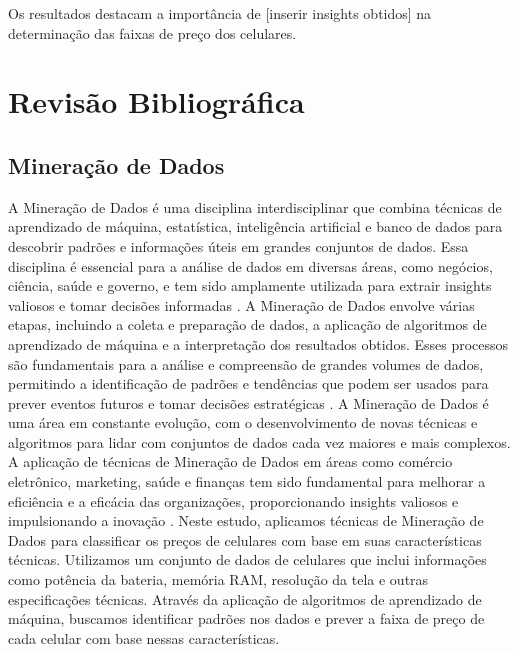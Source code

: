 \documentclass[conference]{IEEEtran}
\begin{document}
Os resultados destacam a importância de [inserir insights obtidos] na determinação das faixas de preço dos celulares.


\section{Revisão Bibliográfica}

\subsection{Mineração de Dados}
A Mineração de Dados é uma disciplina interdisciplinar que combina técnicas de
aprendizado de máquina, estatística, inteligência artificial e banco de dados para
descobrir padrões e informações úteis em grandes conjuntos de dados.
Essa disciplina é essencial para a análise de dados em diversas áreas, como
negócios, ciência, saúde e governo, e tem sido amplamente utilizada para
extrair insights valiosos e tomar decisões informadas \cite{Han2011}.
A Mineração de Dados envolve várias etapas, incluindo a coleta e preparação de
dados, a aplicação de algoritmos de aprendizado de máquina e a interpretação dos
resultados obtidos. Esses processos são fundamentais para a análise e
compreensão de grandes volumes de dados, permitindo a identificação de padrões
e tendências que podem ser usados para prever eventos futuros e tomar decisões
estratégicas \cite{Witten2011}.
A Mineração de Dados é uma área em constante evolução, com o desenvolvimento de
novas técnicas e algoritmos para lidar com conjuntos de dados cada vez maiores e
mais complexos. A aplicação de técnicas de Mineração de Dados em áreas como
comércio eletrônico, marketing, saúde e finanças tem sido fundamental para
melhorar a eficiência e a eficácia das organizações, proporcionando insights
valiosos e impulsionando a inovação \cite{Fayyad1996}.
Neste estudo, aplicamos técnicas de Mineração de Dados para classificar os preços
de celulares com base em suas características técnicas. Utilizamos um conjunto de
dados de celulares que inclui informações como potência da bateria, memória RAM,
resolução da tela e outras especificações técnicas. Através da aplicação de
algoritmos de aprendizado de máquina, buscamos identificar padrões nos dados e
prever a faixa de preço de cada celular com base nessas características.
\end{document}
